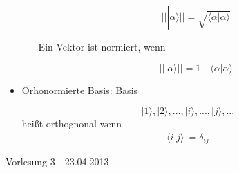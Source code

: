 \documentclass[10pt,article,colorback,accentcolor=tud9d]{scrartcl}
\begin{document}
\begin{itemize}
\begin{itemize}
\begin{fleqn}
\begin{equation}
\left|\right|\left|\right.\alpha\rangle \left|\right|=\sqrt{\langle \alpha\left|\right.
\alpha\rangle }
\end{equation}
\end{fleqn}
Ein Vektor ist normiert, wenn
\begin{fleqn}
\begin{equation}
\left|\right|\left|\right.\alpha\rangle \left|\right| =1 \quad \langle \alpha\left|\right.
\alpha\rangle 
\end{equation}
\end{fleqn}
\end{itemize}
\item Orhonormierte Basis: Basis
\begin{fleqn}
\begin{equation} \nonumber
{\left|\right.1\rangle ,\left|\right.2\rangle ,...,\left|\right.i\rangle ,...,\left|\right.j\rangle ,...}
\end{equation}
heißt orthognonal wenn
\begin{equation}
\langle i\left|\right. j\rangle  \ ={\delta}_{ij}
\end{equation}
\end{fleqn}
\end{itemize}
\begin{flushright}Vorlesung 3 - 23.04.2013\end{flushright}
\end{document}
